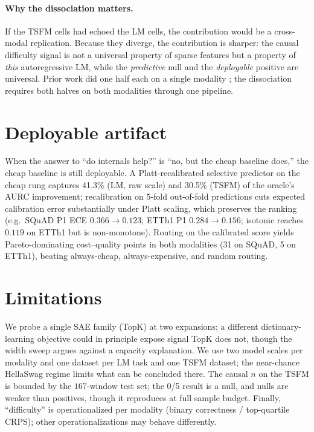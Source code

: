 \documentclass[11pt]{article}
\newcommand{\sae}{SAE}
\begin{document}
\paragraph{Why the dissociation matters.}
If the TSFM cells had echoed the LM cells, the contribution would be a
cross-modal replication. Because they diverge, the contribution is sharper: the
causal difficulty signal is not a universal property of sparse features but a
property of \emph{this} autoregressive LM, while the \emph{predictive} null and
the \emph{deployable} positive are universal. Prior work did one half each on a
single modality \citep{mishra2026ablation,timesae2026}; the dissociation requires
both halves on both modalities through one pipeline.

\section{Deployable artifact}
\label{sec:deploy}

When the answer to ``do internals help?'' is ``no, but the cheap baseline does,''
the cheap baseline is still deployable. A Platt-recalibrated selective predictor
on the cheap rung captures 41.3\% (LM, raw scale) and 30.5\% (TSFM) of the
oracle's AURC improvement; recalibration on 5-fold out-of-fold predictions cuts
expected calibration error substantially under Platt scaling, which preserves the
ranking (e.g.\ SQuAD P1 ECE $0.366\!\to\!0.123$; ETTh1 P1 $0.284\!\to\!0.156$;
isotonic reaches $0.119$ on ETTh1 but is non-monotone). Routing on the calibrated
score yields Pareto-dominating cost--quality points in both modalities
(31 on SQuAD, 5 on ETTh1), beating always-cheap, always-expensive, and random
routing.

\section{Limitations}
\label{sec:limits}

We probe a single \sae{} family (TopK) at two expansions; a different
dictionary-learning objective could in principle expose signal TopK does not,
though the width sweep argues against a capacity explanation. We use two model
scales per modality and one dataset per LM task and one TSFM dataset; the
near-chance HellaSwag regime limits what can be concluded there. The causal $n$
on the TSFM is bounded by the $167$-window test set; the 0/5 result is a null,
and nulls are weaker than positives, though it reproduces at full sample budget.
Finally, ``difficulty'' is operationalized per modality (binary correctness /
top-quartile CRPS); other operationalizations may behave differently.
\end{document}
